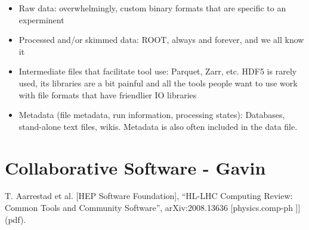 \begin{comment}
Harrison B. Prosper, Sezen Sekmen, Gokhan Unel. ”Analysis Description Language: A DSL for HEP Analysis”, arXiv:2203.09886 [hep-ph] (pdf). (also relevant to CompF07)
- emphasizes the need for semantic analysis to make collaboration with theory easier
- also makes an analysis self-documenting (Amy: to a degree)
- prefers a language-independent DSL, an "external DSL" for easier interoperability
- identifies DSL requirements as (1) easily understood by a physicist, (2) unambiguous, (3) domain complete.  I feel like (1) and possibly (2) need more clarification for this to be a true requirement list
- people do use the Analysis Description Language (analysis schools, Future Circular Collider studies), not clear if the use is limited to a specific group or groups, no complete LHC analysis yet
- Obvious enhancement of existing DSL would be to re-write to target LLVM.  (Amy: huh, okay, maybe it is time to think about DSLs?)

C. Backhouse. ”The CAFAna framework for neutrino analysis”, arXiv:2203.13768 [hep-ex] (pdf). (also under NF01)
- I feel like I need to re-read this paper (Amy)
- ROOT format files
- has been used by multiple neutrino experiments!
- connected with STAN to provide MCMC + analytic derivatives
\end{comment}

\begin{itemize}
  \item Raw data: overwhelmingly, custom binary formats that are specific to an experminent
  \item Processed and/or skimmed data: ROOT, always and forever, and we all know it
  \item Intermediate files that facilitate tool use: Parquet, Zarr, etc.  HDF5 is rarely used, its libraries are a bit painful and all the tools people want to use work with file formats that have friendlier IO libraries
  \item Metadata (file metadata, run information, processing states): Databases, stand-alone text files, wikis.  Metadata is also often included in the data file.
\end{itemize}



\section{Collaborative Software - Gavin}
T. Aarrestad et al. [HEP Software Foundation], “HL-LHC Computing Review: Common Tools and Community Software”, arXiv:2008.13636 [physics.comp-ph ]] (pdf).

